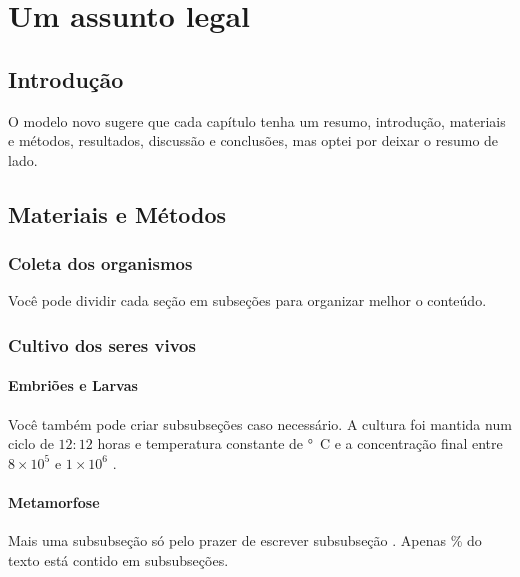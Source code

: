 \chapter{Um assunto legal}\label{cap2}

\section{Introdução}\label{cap2:intro}

O modelo novo sugere que cada capítulo tenha um resumo, introdução, materiais e métodos, resultados, discussão e conclusões, mas optei por deixar o resumo de lado.

\section{Materiais e Métodos}\label{cap2:mem}

\subsection{Coleta dos organismos}\label{cap2:mem:coleta}

Você pode dividir cada seção em subseções para organizar melhor o conteúdo.

\subsection{Cultivo dos seres vivos}\label{cap2:mem:gametas}

\subsubsection{Embriões e Larvas}

Você também pode criar subsubseções caso necessário.
A cultura foi mantida num ciclo de $12:12$ horas e temperatura constante de \unit[24]{°C} e a concentração final entre $8\times10^5$ e $1\times10^6$ .

\subsubsection{Metamorfose}

Mais uma subsubseção só pelo prazer de escrever subsubseção \citep{Highsmith1982}. Apenas \unit[4]{\%} do texto está contido em subsubseções.


